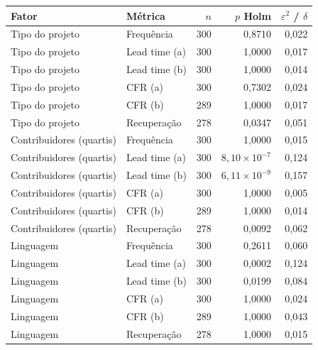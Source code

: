 \begin{tabular}{llrrr}
\hline
Fator & Métrica & $n$ & $p$ Holm & $\varepsilon^2$ / $\delta$ \\
\hline
Tipo do projeto & Frequência & 300 & 0,8710 & 0,022 \\
Tipo do projeto & Lead time (a) & 300 & 1,0000 & 0,017 \\
Tipo do projeto & Lead time (b) & 300 & 1,0000 & 0,014 \\
Tipo do projeto & CFR (a) & 300 & 0,7302 & 0,024 \\
Tipo do projeto & CFR (b) & 289 & 1,0000 & 0,017 \\
Tipo do projeto & Recuperação & 278 & 0,0347 & 0,051 \\
Contribuidores (quartis) & Frequência & 300 & 1,0000 & 0,015 \\
Contribuidores (quartis) & Lead time (a) & 300 & $8,10\times 10^{-7}$ & 0,124 \\
Contribuidores (quartis) & Lead time (b) & 300 & $6,11\times 10^{-9}$ & 0,157 \\
Contribuidores (quartis) & CFR (a) & 300 & 1,0000 & 0,005 \\
Contribuidores (quartis) & CFR (b) & 289 & 1,0000 & 0,014 \\
Contribuidores (quartis) & Recuperação & 278 & 0,0092 & 0,062 \\
Linguagem & Frequência & 300 & 0,2611 & 0,060 \\
Linguagem & Lead time (a) & 300 & 0,0002 & 0,124 \\
Linguagem & Lead time (b) & 300 & 0,0199 & 0,084 \\
Linguagem & CFR (a) & 300 & 1,0000 & 0,024 \\
Linguagem & CFR (b) & 289 & 1,0000 & 0,043 \\
Linguagem & Recuperação & 278 & 1,0000 & 0,015 \\
\hline
\end{tabular}
